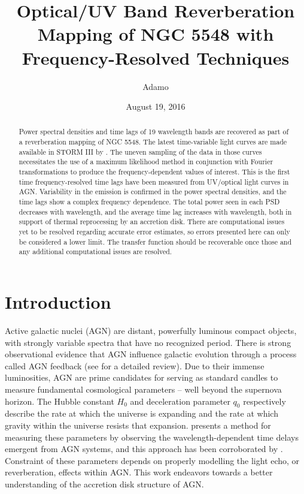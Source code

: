 \documentclass[11pt,letterpaper]{article}
\begin{document}
\title{Optical/UV Band
Reverberation Mapping of NGC 5548 with Frequency-Resolved Techniques}

\author{Adamo}
\date{August 19, 2016}

\maketitle

\begin{abstract}

Power spectral densities and time lags of 19 wavelength bands are recovered as part of a reverberation mapping of NGC 5548. The latest time-variable light curves are made available in STORM III by \cite{2016ApJ...821...56F}. The uneven sampling of the data in those curves necessitates the use of a maximum likelihood method in conjunction with Fourier transformations to produce the frequency-dependent values of interest. This is the first time frequency-resolved time lags have been measured from UV/optical light curves in AGN. Variability in the emission is confirmed in the power spectral densities, and the time lags show a complex frequency dependence. The total power seen in each PSD decreases with wavelength, and the average time lag increases with wavelength, both in support of thermal reprocessing by an accretion disk. There are computational issues yet to be resolved regarding accurate error estimates, so errors presented here can only be considered a lower limit. The transfer function should be recoverable once those and any additional computational issues are resolved.

\end{abstract}


\section{Introduction}
\label{sec:intro}

Active galactic nuclei (AGN) are distant, powerfully luminous compact objects, with strongly variable spectra that have no recognized period. There is strong observational evidence that AGN influence galactic evolution through a process called AGN feedback (see \cite{2012ARA&A..50..455F} for a detailed review). Due to their immense luminosities, AGN are prime candidates for serving as standard candles to measure fundamental cosmological parameters -- well beyond the supernova horizon. The Hubble constant $H_0$ and deceleration parameter $q_0$ respectively describe the rate at which the universe is expanding and the rate at which gravity within the universe resists that expansion. \cite{1999MNRAS.302L..24C} presents a method for measuring these parameters by observing the wavelength-dependent time delays emergent from AGN systems, and this approach has been corroborated by \cite{2007MNRAS.380..669C}. Constraint of these parameters depends on properly modelling the light echo, or reverberation, effects within AGN. This work endeavors towards a better understanding of the accretion disk structure of AGN.
\end{document}

